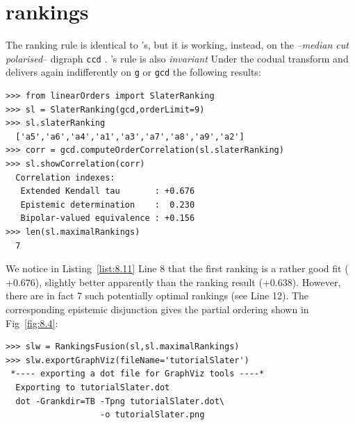 \section{\Slater rankings}
\label{sec:8.5}

The \Slater ranking rule is identical to \Kemeny 's, but it is working, instead, on the \Condorcet --\emph{median cut polarised}-- digraph \texttt{ccd} \citep{SLA-1961}. \Slater 's rule is also \emph{invariant} Under the codual transform and delivers again indifferently on \texttt{g} or \texttt{gcd} the following results:
\begin{lstlisting}[caption={Computing a \Slater ranking},label=list:8.11]   
>>> from linearOrders import SlaterRanking
>>> sl = SlaterRanking(gcd,orderLimit=9)
>>> sl.slaterRanking
  ['a5','a6','a4','a1','a3','a7','a8','a9','a2']
>>> corr = gcd.computeOrderCorrelation(sl.slaterRanking)
>>> sl.showCorrelation(corr)
  Correlation indexes:
   Extended Kendall tau       : +0.676
   Epistemic determination    :  0.230
   Bipolar-valued equivalence : +0.156
>>> len(sl.maximalRankings)
  7
\end{lstlisting}
We notice in Listing~\ref{list:8.11} Line 8 that the first \Slater ranking is a rather good fit ($+0.676$), slightly better apparently than the \NetFlows ranking result ($+0.638$). However, there are in fact 7 such potentially optimal \Slater rankings (see Line 12). The corresponding epistemic disjunction gives the partial ordering shown in Fig~\ref{fig:8.4}:
\begin{lstlisting}[caption={Computing the epistemic disjunction of optimal \Slater rankings},label=list:8.12]   
>>> slw = RankingsFusion(sl,sl.maximalRankings)
>>> slw.exportGraphViz(fileName='tutorialSlater')
 *---- exporting a dot file for GraphViz tools ----*
  Exporting to tutorialSlater.dot
  dot -Grankdir=TB -Tpng tutorialSlater.dot\
                   -o tutorialSlater.png
\end{lstlisting}
